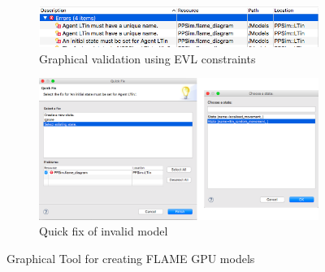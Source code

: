 \documentclass{UoYCSproject}
\begin{document}
\begin{figure}[htp]\ContinuedFloat
\centering
\begin{subfigure}{\textwidth}
\centering
\includegraphics[width=\textwidth]{Appendix/validation_gmf}
\caption{Graphical validation using EVL constraints}
\label{fig:validation_gmf}
\end{subfigure}

\begin{subfigure}{\textwidth}
\centering
\includegraphics[width=\textwidth]{Appendix/validation_quickfix_gmf}
\caption{Quick fix of invalid model}
\label{fig:validation_quickfix_gmf}
\end{subfigure}%

\caption{Graphical Tool for creating FLAME GPU models}
\label{fig:gmf}
\end{figure}
 
\end{document}
